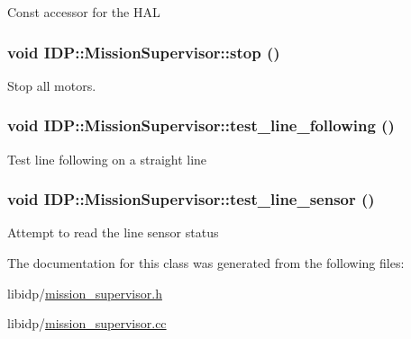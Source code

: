 Const accessor for the HAL \hypertarget{classIDP_1_1MissionSupervisor_d11e444b6be1d51c3339bd6397d45fd4}{
\subsubsection[{stop}]{\setlength{\rightskip}{0pt plus 5cm}void IDP::MissionSupervisor::stop ()}}
\label{classIDP_1_1MissionSupervisor_d11e444b6be1d51c3339bd6397d45fd4}


Stop all motors. \hypertarget{classIDP_1_1MissionSupervisor_21be0b52e2f13c7fb373c90dae77ba23}{
\subsubsection[{test\_\-line\_\-following}]{\setlength{\rightskip}{0pt plus 5cm}void IDP::MissionSupervisor::test\_\-line\_\-following ()}}
\label{classIDP_1_1MissionSupervisor_21be0b52e2f13c7fb373c90dae77ba23}


Test line following on a straight line \hypertarget{classIDP_1_1MissionSupervisor_f147b0bec9464bb7e956a40a7f3d0fda}{
\subsubsection[{test\_\-line\_\-sensor}]{\setlength{\rightskip}{0pt plus 5cm}void IDP::MissionSupervisor::test\_\-line\_\-sensor ()}}
\label{classIDP_1_1MissionSupervisor_f147b0bec9464bb7e956a40a7f3d0fda}


Attempt to read the line sensor status 

The documentation for this class was generated from the following files:\begin{CompactItemize}
\item 
libidp/\hyperlink{mission__supervisor_8h}{mission\_\-supervisor.h}\item 
libidp/\hyperlink{mission__supervisor_8cc}{mission\_\-supervisor.cc}\end{CompactItemize}
